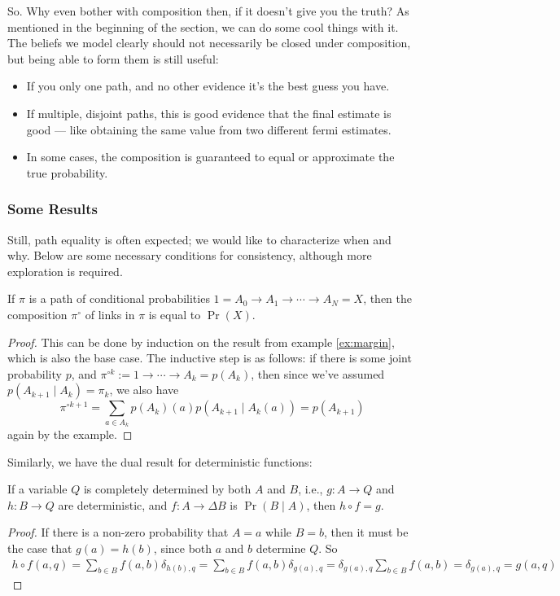 \documentclass{article}
\begin{document}
	So. Why even bother with composition then, if it doesn't give you the truth? As mentioned in the beginning of the section, we can do some cool things with it. The beliefs we model clearly should not necessarily be closed under composition, but being able to form them is still useful:
	\begin{itemize}[nosep]
		\item If you only one path, and no other evidence it's the best guess you have.
		\item If multiple, disjoint paths, this is good evidence that the final estimate is good --- like obtaining the same value from two different fermi estimates.
		\item In some cases, the composition is guaranteed to equal or approximate the true probability.
	\end{itemize}

	\subsubsection{Some Results} \label{sec:commute-results}
	Still, path equality is often expected; we would like to characterize when and why. Below are some necessary conditions for consistency, although more exploration is required.
	
	\begin{prop}\label{prop:prob-eq}
		If $\pi$ is a path of conditional probabilities $1 = A_0 \to A_1\to\cdots \to A_N = X$, then the composition $\pi^\circ$ of links in $\pi$ is equal to $\Pr(X)$.
	\end{prop}
	\begin{proof}
		This can be done by induction on the result from example \ref{ex:margin}, which is also the base case. The inductive step is as follows: if there is some joint probability $p$, and $\pi^{\circ k} := 1 \to \cdots \to A_k = p(A_k)$, then since we've assumed $p(A_{k+1} \mid A_k) = \pi_k$, we also have 
		\[ \pi^{\circ k+1} = \sum_{a \in A_k} p(A_k)(a) p(A_{k+1} \mid A_k(a)) = p(A_{k+1}) \] again by the example.
	\end{proof}

	Similarly, we have the dual result for deterministic functions:
	\begin{prop}\label{prop:det-eq}
		If a variable $Q$ is completely determined by both $A$ and $B$, i.e., $g : A\to Q$ and $h : B\to Q$ are deterministic, and $f : A \to \Delta B$ is $\Pr(B \mid A)$, then $h \circ f = g$. 
	\end{prop}
	\begin{proof}
		If there is a non-zero probability that $A = a$ while $B = b$, then it must be the case that $g(a) = h(b)$, since both $a$ and $b$ determine $Q$. So
		\begin{align*}
			h \circ f(a,q) = \sum_{b \in B} f(a,b) \delta_{h(b),q}	
					= \sum_{b \in B} f(a,b) \delta_{g(a), q} 
					= \delta_{g(a),q} \sum_{b \in B} f(a,b) 
					= \delta_{g(a),q} 
					= g(a, q)
		\end{align*}
	\end{proof}
\end{document}
